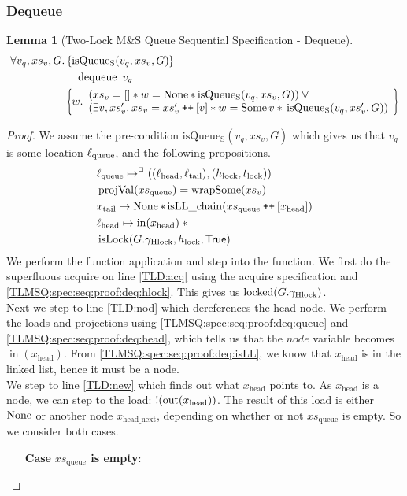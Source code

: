 \documentclass[a4paper, 10pt]{report}
\theoremstyle{definition}
\newtheorem{lemma}[theorem]{Lemma}
\newcommand{\isLock}{\operatorname{isLock}}
\newcommand{\locked}{\operatorname{locked}}
\newcommand{\dequeue}{\operatorname{dequeue}}
\newcommand{\msq}{M\&S Queue}
\newcommand{\tlmsq}{Two-Lock \msq{}}
\newcommand{\isqueueseq}{\operatorname{isQueue_{S}}}
\newcommand{\vq}{v_q}
\newcommand{\xsqueue}{xs_{\mathrm{queue}}}
\newcommand{\isLLchain}{\operatorname{isLL\_chain}}
\newcommand{\projval}{\operatorname{projVal}}
\newcommand{\wrapsome}{\operatorname{wrapSome}}
\newcommand{\locN}[1]{\loc_{\mathrm{#1}}}
\newcommand{\lochead}{\locN{head}}
\newcommand{\loctail}{\locN{tail}}
\newcommand{\locqueue}{\locN{queue}}
\newcommand{\nodeval}{\valB}
\newcommand{\nIn}[1]{\operatorname{in}(#1)}
\newcommand{\nOut}[1]{\operatorname{out}(#1)}
\newcommand{\node}{x}
\newcommand{\nodeN}[1]{\node_{\mathrm{#1}}}
\newcommand{\nodehead}{\nodeN{head}}
\newcommand{\nodetail}{\nodeN{tail}}
\newcommand{\nodeheadnext}{\nodeN{head\_next}}
\newcommand{\absvalue}{\val}
\newcommand{\absvalueList}{xs_v}
\newcommand{\Hlock}{h_{\mathrm{lock}}}
\newcommand{\Tlock}{t_{\mathrm{lock}}}
\newcommand{\Qg}{G}
\newcommand{\ghlock}{\gname_{\mathrm{Hlock}}}
\newcommand\catenate{\mathbin{\text{\ttfamily\upshape ++}}}
\newcommand{\tlseqspecdeqHT}[3]{\hoareV[t]{\isqueueseq(#1, #2, #3)}{\dequeue \ #1}{\nodeval . \begin{array}{l}(#2 = [] \star{} \nodeval = \None \star{} \isqueueseq(#1, #2, #3)) \lor{}\\ (\Exists \absvalue, #2' . #2 = #2' \catenate [\absvalue] \star{} \nodeval = \Some \absvalue \star{} \isqueueseq(#1, #2', #3)) \end{array}}}
\newcommand{\tlseqspecdeqGen}[3]{\All #1, #2, #3. \tlseqspecdeqHT{#1}{#2}{#3}}
\newcommand{\tlseqspecdeq}{\tlseqspecdeqGen{\vq}{\absvalueList}{\Qg}}
\begin{document}
\subsubsection{Dequeue}
\begin{lemma}[\tlmsq{} Sequential Specification - Dequeue]\label{TLMSQ:spec:seq:dequeue}
  \begin{equation*}
    \tlseqspecdeq
  \end{equation*}
\end{lemma}
\begin{proof}
We assume the pre-condition $\isqueueseq(\vq, \absvalueList, \Qg)$ which gives us that $\vq$ is some location $\locqueue$, and the following propositions.
\begin{align}
  &\locqueue \mapsto^{\persistently} ((\lochead, \loctail), (\Hlock, \Tlock))\label{TLMSQ:spec:seq:proof:deq:queue}\\
  &\projval(\xsqueue) = \wrapsome(\absvalueList)\label{TLMSQ:spec:seq:proof:deq:rel}\\
  &\nodetail \mapsto \None \star{} \isLLchain (\xsqueue \catenate [\nodehead])\label{TLMSQ:spec:seq:proof:deq:isLL}\\
  &\lochead \mapsto \nIn{\nodehead} \star{}\label{TLMSQ:spec:seq:proof:deq:head}\\
  &\isLock(\Qg.\ghlock, \Hlock, \TRUE)\label{TLMSQ:spec:seq:proof:deq:hlock}
\end{align}
We perform the function application and step into the function. We first do the superfluous acquire on line \ref{TLD:acq} using the acquire specification and \ref{TLMSQ:spec:seq:proof:deq:hlock}. This gives us $\locked(\Qg.\ghlock)$.\\
Next we step to line \ref{TLD:nod} which dereferences the head node. We perform the loads and projections using \ref{TLMSQ:spec:seq:proof:deq:queue} and \ref*{TLMSQ:spec:seq:proof:deq:head}, which tells us that the $node$ variable becomes $\nIn{\nodehead}$. From \ref{TLMSQ:spec:seq:proof:deq:isLL}, we know that $\nodehead$ is in the linked list, hence it must be a node.\\
We step to line \ref{TLD:new} which finds out what $\nodehead$ points to. As $\nodehead$ is a node, we can step to the load: $\deref (\nOut{\nodehead})$. The result of this load is either $\operatorname{None}$ or another node $\nodeheadnext$, depending on whether or not $\xsqueue$ is empty. So we consider both cases.
\begin{itemize}
  \item[\textbf{Case}] \textbf{$\xsqueue$ is empty}:

\end{itemize}
\end{proof}
\end{document}
